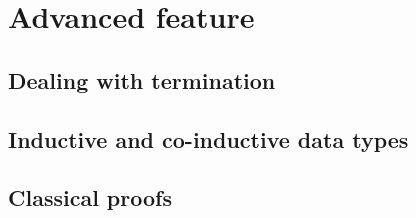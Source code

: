 \chapter{Advanced feature}

\section{Dealing with termination}

\section{Inductive and co-inductive data types}

\section{Classical proofs}
